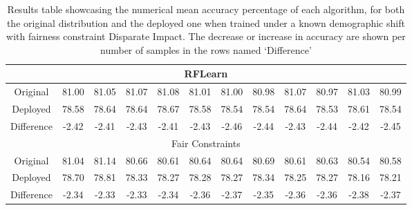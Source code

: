 \begin{table}[ht]
\begin{tabular}{|c|ccccccccccc|}
\multicolumn{12}{|c|}{RFLearn} \\ \hline
Original & 81.00 & 81.05 & 81.07 & 81.08 & 81.01 & 81.00 & 80.98 & 81.07 & 80.97 & 81.03 & 80.99 \\ \hline
Deployed & 78.58 & 78.64 & 78.64 & 78.67 & 78.58 & 78.54 & 78.54 & 78.64 & 78.53 & 78.61 & 78.54 \\ \hline
Difference & -2.42 & -2.41 & -2.43 & -2.41 & -2.43 & -2.46 & -2.44 & -2.43 & -2.44 & -2.42 & -2.45 \\ \hline

\multicolumn{12}{|c|}{Fair Constraints} \\ \hline
Original & 81.04 & 81.14 & 80.66 & 80.61 & 80.64 & 80.64 & 80.69 & 80.61 & 80.63 & 80.54 & 80.58 \\ \hline
Deployed & 78.70 & 78.81 & 78.33 & 78.27 & 78.28 & 78.27 & 78.34 & 78.25 & 78.27 & 78.16 & 78.21 \\ \hline
Difference & -2.34 & -2.33 & -2.33 & -2.34 & -2.36 & -2.37 & -2.35 & -2.36 & -2.36 & -2.38 & -2.37 \\ \hline

\end{tabular}
\caption{Results table showcasing the numerical mean accuracy percentage of each algorithm, for both the original distribution and the deployed one when trained under a known demographic shift with fairness constraint Disparate Impact. The decrease or increase in accuracy are shown per number of samples in the rows named `Difference'}
\label{tab:uci_num_k_DI}
\end{table}

